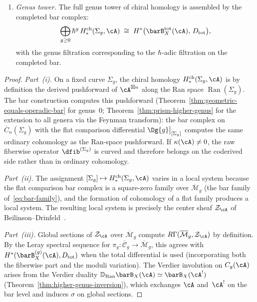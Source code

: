 \begin{theorem}
\begin{enumerate}[label=\textup{(\roman*)}]
\item \emph{Genus tower.}
 The full genus tower of chiral homology is assembled by the
 completed bar complex:
 \begin{equation}\label{eq:chiral-homology-tower}
 \bigoplus_{g \geq 0} \hbar^{g}\,
 H^{\mathrm{ch}}_*(\Sigma_g, \cA)
 \;\cong\;
 H^*\bigl(\barB^{\mathrm{tot}}_X(\cA),\, D_{\mathrm{tot}}\bigr),
 \end{equation}
 with the genus filtration corresponding to the $\hbar$-adic
 filtration on the completed bar.
\end{enumerate}
\end{theorem}

\begin{proof}
\emph{Part~(i).}
On a fixed curve $\Sigma_g$, the chiral homology
$H^{\mathrm{ch}}_*(\Sigma_g, \cA)$ is by definition
\cite[3.4.4]{BD04} the derived pushforward of $\cA^{\boxtimes n}$
along the Ran space $\operatorname{Ran}(\Sigma_g)$. The bar
construction computes this pushforward
(Theorem~\ref{thm:geometric-equals-operadic-bar} for genus~$0$;
Theorem~\ref{thm:prism-higher-genus} for the extension to all
genera via the Feynman transform): the bar complex on
$\overline{C}_n(\Sigma_g)$ with the flat comparison differential
$\Dg{g}\big|_{[\Sigma_g]}$ computes the same ordinary cohomology as
the Ran-space pushforward. If $\kappa(\cA) \neq 0$, the raw fiberwise
operator $\dfib^{(\Sigma_g)}$ is curved and therefore belongs on the
coderived side rather than in ordinary cohomology.

\emph{Part~(ii).}
The assignment $[\Sigma_g] \mapsto
H^{\mathrm{ch}}_*(\Sigma_g, \cA)$ varies in a local system because
the flat comparison bar complex is a square-zero family over
$\overline{\mathcal{M}}_g$
(the bar family of~\eqref{eq:bar-family}), and the formation of
cohomology of a flat family produces a local system. The resulting
local system is precisely the center sheaf $\mathcal{Z}_\cA$ of
Beilinson--Drinfeld~\cite[3.4.10]{BD04}.

\emph{Part~(iii).}
Global sections of $\mathcal{Z}_\cA$ over
$\overline{\mathcal{M}}_g$ compute
$R\Gamma(\overline{\mathcal{M}}_g, \mathcal{Z}_\cA)$
by definition.
By the Leray spectral sequence for
$\pi_g\colon \overline{\mathcal{C}}_g \to \overline{\mathcal{M}}_g$,
this agrees with
$H^*(\barB^{(g)}_X(\cA), D_{\mathrm{tot}})$ when the total
differential is used (incorporating both the fiberwise part and
the moduli variation). The Verdier involution on $C_g(\cA)$
arises from the Verdier duality
$\mathbb{D}_{\operatorname{Ran}} \barB_X(\cA) \simeq
\barB_X(\cA^!)$
(Theorem~\ref{thm:higher-genus-inversion}), which exchanges
$\cA$ and~$\cA^!$ on the bar level and induces $\sigma$ on
global sections.


\end{proof}
